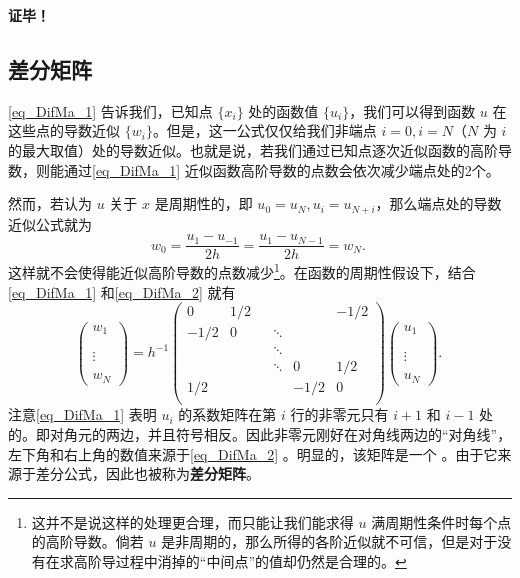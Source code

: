 \textbf{证毕！}

\subsection{差分矩阵}
\autoref{eq_DifMa_1} 告诉我们，已知点 $\{x_i\}$ 处的函数值 $\{u_i\}$，我们可以得到函数 $u$ 在这些点的导数近似 $\{w_i\}$。但是，这一公式仅仅给我们非端点 $i=0,i=N$（$N$ 为 $i$ 的最大取值）处的导数近似。也就是说，若我们通过已知点逐次近似函数的高阶导数，则能通过\autoref{eq_DifMa_1} 近似函数高阶导数的点数会依次减少端点处的2个。

然而，若认为 $u$ 关于 $x$ 是周期性的，即 $u_0=u_N,u_i=u_{N+i}$，那么端点处的导数近似公式就为
\begin{equation}\label{eq_DifMa_2}
w_0=\frac{u_{1}-u_{-1}}{2h}=\frac{u_{1}-u_{N-1}}{2h}=w_N.~
\end{equation}
这样就不会使得能近似高阶导数的点数减少\footnote{这并不是说这样的处理更合理，而只能让我们能求得 $u$ 满周期性条件时每个点的高阶导数。倘若 $u$ 是非周期的，那么所得的各阶近似就不可信，但是对于没有在求高阶导过程中消掉的“中间点”的值却仍然是合理的。}。在函数的周期性假设下，结合\autoref{eq_DifMa_1} 和\autoref{eq_DifMa_2} 就有
\begin{equation}
\begin{pmatrix}
w_1\\
\\
\\
\vdots\\
\\
w_N
\end{pmatrix}=h^{-1}\begin{pmatrix}
0&1/2&&&&-1/2\\
-1/2&0&&\ddots&&\\
&&&\ddots&&\\
&&&\ddots&0&1/2\\
1/2&&&&-1/2&0\\
\end{pmatrix}\begin{pmatrix}
u_1\\
\\
\\
\vdots\\
\\
u_N
\end{pmatrix}.~
\end{equation}
注意\autoref{eq_DifMa_1} 表明 $u_i$ 的系数矩阵在第 $i$ 行的非零元只有 $i+1$ 和 $i-1$ 处的。即对角元的两边，并且符号相反。因此非零元刚好在对角线两边的“对角线”，左下角和右上角的数值来源于\autoref{eq_DifMa_2} 。明显的，该矩阵是一个 。由于它来源于差分公式，因此也被称为\textbf{差分矩阵}。


